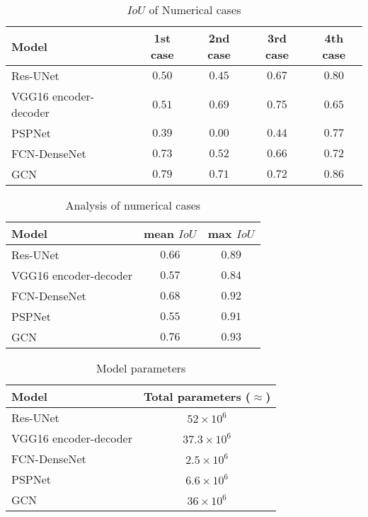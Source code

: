 \begin{table}[ht!]
	\centering
	\caption{\(IoU\) of Numerical cases}
	\label{tab:table_numerical_cases}
	{
		\begin{tabular}{lcccc}
			\toprule
			Model & 1st case & 2nd case & 3rd case & 4th case \\ 
			\midrule 
			Res-UNet & \(0.50\) & \(0.45\) & \(0.67\) & \(0.80\) \\ 
			VGG16 encoder-decoder & \(0.51\) & \(0.69\) & \(0.75\) & \(0.65\)\\ 
			PSPNet & \(0.39\) & \(0.00\) & \(0.44\)  & \(0.77\) \\ 
			FCN-DenseNet & \(0.73\) & \(0.52\) & \(0.66\) & \(0.72\) \\
			GCN & \(0.79\) & \(0.71\) & \(0.72\) & \(0.86\) \\ 
			\bottomrule
		\end{tabular}
	}
\end{table}
\begin{table}[ht!]
	\centering
	\caption{Analysis of numerical cases}
	\label{tab:table_all_numerical_cases}
	{
		\begin{tabular}{lcc}
			\toprule
			Model & mean \(IoU\) & max \(IoU\) \\ 
			\midrule 
			Res-UNet & \(0.66\) & \(0.89\) \\ 
			VGG16 encoder-decoder & \(0.57\) & \(0.84\) \\ 
			FCN-DenseNet & \(0.68\) & \(0.92\) \\ 
			PSPNet & \(0.55\) & \(0.91\) \\ 
			GCN & \(0.76\) & \(0.93\) \\ 
			\bottomrule
		\end{tabular}
	}
\end{table}
\begin{table}[ht!]
	\centering
	\caption{Model parameters}
	\label{tab:table_parameters}
	{
		\begin{tabular}{lc}
			\toprule
			Model & Total parameters ($\approx$) \\ 
			\midrule 
			Res-UNet & \(52\times 10^{6}\) \\ 
			VGG16 encoder-decoder & \(37.3\times 10^{6}\) \\ 
			FCN-DenseNet & \(2.5\times 10^{6}\) \\ 
			PSPNet & \(6.6\times 10^{6}\) \\ 
			GCN & \(36\times 10^{6}\) \\ 
			\bottomrule
		\end{tabular}
	}
\end{table}
